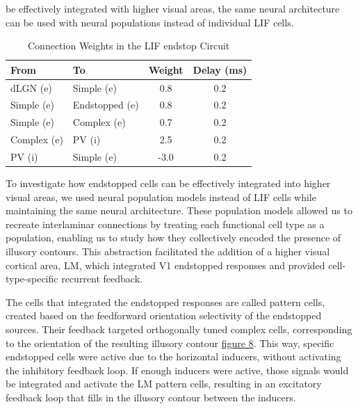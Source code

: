 \documentclass[12pt]{article}
\begin{document}
be effectively integrated with higher visual areas, the same neural architecture can be used with neural populations instead of individual LIF cells. 

\begin{table}[h]
  \centering
  \caption{Connection Weights in the LIF endstop Circuit}
  \begin{tabular}{@{}llcc@{}}
      \toprule
      \textbf{From} & \textbf{To} & \textbf{Weight} & \textbf{Delay (ms)} \\ \midrule
      dLGN (e) & Simple (e) & 0.8 & 0.2 \\
      Simple (e) & Endstopped (e) & 0.8 & 0.2 \\
      Simple (e) & Complex (e) & 0.7 & 0.2 \\
      Complex (e) & PV (i) & 2.5 & 0.2 \\
      PV (i) & Simple (e) & -3.0 & 0.2 \\ \bottomrule
  \end{tabular}
\end{table}

To investigate how endstopped cells can be effectively integrated into higher visual areas, we used neural population models instead of LIF cells while maintaining the same neural architecture. These population models allowed us to recreate interlaminar connections by treating each functional cell type as a population, enabling us to study how they collectively encoded the presence of illusory contours. This abstraction facilitated the addition of a higher visual cortical area, LM, which integrated V1 endstopped responses and provided cell-type-specific recurrent feedback.

The cells that integrated the endstopped responses are called pattern cells, created based on the feedforward orientation selectivity of the endstopped sources. Their feedback targeted orthogonally tuned complex cells, corresponding to the orientation of the resulting illusory contour \hyperref[fig:illusory_filling]{figure 8}. This way, specific endstopped cells were active due to the horizontal inducers, without activating the inhibitory feedback loop. If enough inducers were active, those signals would be integrated and activate the LM pattern cells, resulting in an excitatory feedback loop that fills in the illusory contour between the inducers.
\end{document}
